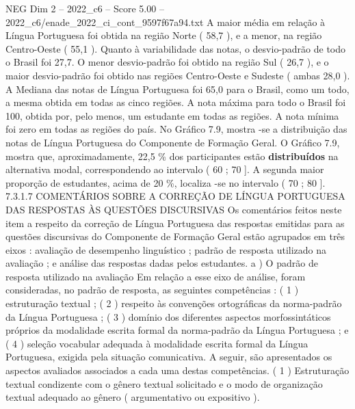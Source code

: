 \begin{textsample}{NEG Dim 2 – 2022\_c6 – Score 5.00 – 2022\_c6/enade\_2022\_ci\_cont\_9597f67a94.txt}
A maior média em relação à Língua Portuguesa foi obtida na região Norte ( 58,7 ), e a menor, na região Centro-Oeste ( 55,1 ).
Quanto à variabilidade das notas, o desvio-padrão de todo o Brasil foi 27,7.
O menor desvio-padrão foi obtido na região Sul ( 26,7 ), e o maior desvio-padrão foi obtido nas regiões Centro-Oeste e Sudeste ( ambas 28,0 ).
A Mediana das notas de Língua Portuguesa foi 65,0 para o Brasil, como um todo, a mesma obtida em todas as cinco regiões.
A nota máxima para todo o Brasil foi 100, obtida por, pelo menos, um estudante em todas as regiões.
A nota mínima foi zero em todas as regiões do país.
No Gráfico 7.9, mostra -se a distribuição das notas de Língua Portuguesa do Componente de Formação Geral.
O Gráfico 7.9, mostra que, aproximadamente, 22,5 \% dos participantes estão \textbf{distribuídos} na alternativa modal, correspondendo ao intervalo ( 60 ; 70 ].
A segunda maior proporção de estudantes, acima de 20 \%, localiza -se no intervalo ( 70 ; 80 ]. 7.3.1.7 COMENTÁRIOS SOBRE A CORREÇÃO DE LÍNGUA PORTUGUESA DAS RESPOSTAS ÀS QUESTÕES DISCURSIVAS Os comentários feitos neste item a respeito da correção de Língua Portuguesa das respostas emitidas para as questões discursivas do Componente de Formação Geral estão agrupados em três eixos : avaliação de desempenho linguístico ; padrão de resposta utilizado na avaliação ; e análise das respostas dadas pelos estudantes. a ) O padrão de resposta utilizado na avaliação Em relação a esse eixo de análise, foram consideradas, no padrão de resposta, as seguintes competências : ( 1 ) estruturação textual ; ( 2 ) respeito às convenções ortográficas da norma-padrão da Língua Portuguesa ; ( 3 ) domínio dos diferentes aspectos morfossintáticos próprios da modalidade escrita formal da norma-padrão da Língua Portuguesa ; e ( 4 ) seleção vocabular adequada à modalidade escrita formal da Língua Portuguesa, exigida pela situação comunicativa.
A seguir, são apresentados os aspectos avaliados associados a cada uma destas competências. ( 1 ) Estruturação textual condizente com o gênero textual solicitado e o modo de organização textual adequado ao gênero ( argumentativo ou expositivo ).

\end{textsample}
